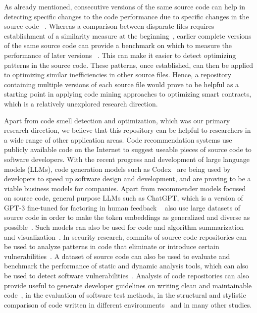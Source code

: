 \documentclass[10pt,conference]{IEEEtran}
\begin{document}
	As already mentioned, consecutive versions of the same source code can help in detecting specific changes to the code performance due to specific changes in the source code ~\cite{softwareversion}. Whereas a comparison between disparate files requires establishment of a similarity measure at the beginning~\cite{simsimilarity}, earlier complete versions of the same source code can provide a benchmark on which to measure the performance of later versions ~\cite{softwareversion}. This can make it easier to detect optimizing patterns in the source code. These patterns, once established, can then be applied to optimizing similar inefficiencies in other source files. Hence, a repository containing multiple versions of each source file would prove to be helpful as a starting point in applying code mining approaches to optimizing smart contracts, which is a relatively unexplored research direction.
	
	Apart from code smell detection and optimization, which was our primary research direction, we believe that this repository can be helpful to researchers in a wide range of other application areas. Code recommendation systems use publicly available code on the Internet to suggest useable pieces of source code to software developers. With the recent progress and development of large language models (LLMs), code generation models such as Codex~\cite{codex} are being used by developers to speed up software design and development, and are proving to be a viable business models for companies. Apart from recommender models focused on source code, general purpose LLMs such as ChatGPT, which is a version of GPT-3 fine-tuned for factoring in human feedback ~\cite{chatgpt} also use large datasets of source code in order to make the token embeddings as generalized and diverse as possible~\cite{thestack}. Such models can also be used for code and algorithm summarization and visualization~\cite{codesummarization}. In security research, commits of source code repositories can be used to analyze patterns in code that eliminate or introduce certain vulnerabilities~\cite{securitydataset}. A dataset of source code can also be used to evaluate and benchmark the performance of static and dynamic analysis tools, which can also be used to detect software vulnerabilities~\cite{staticanalysis}. Analysis of code repositories can also provide useful to generate developer guidelines on writing clean and maintainable code~\cite{maintainablecode}, in the evaluation of software test methods\cite{testmethodevaluation}, in the structural and stylistic comparison of code written in different environments~\cite{codestylecomparison} and in many other studies. 
	
\end{document}
